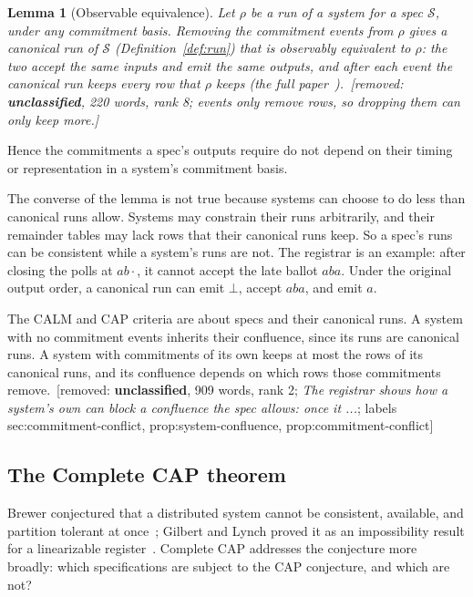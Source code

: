 \documentclass[sigconf]{cidr-2027}
\newtheorem{lemma}{Lemma}
\theoremstyle{remark}
\newcommand{\commitment}{commitment\xspace}
\newcommand{\commitments}{commitments\xspace}
\newcommand{\Spec}{\mathcal{S}}
\newcommand{\extended}{the full paper~\cite{hellerstein2026completecalmfull}}
\newcommand{\removednote}[1]{{\color{cutred}\footnotesize\,[removed: #1]\,}}
\begin{document}
\begin{lemma}[Observable equivalence]
\label{lem:canonical-equivalent}
Let $\rho$ be a run of a system for a spec $\Spec$, under any \commitment
basis. \textcolor{newblue}{Removing the \commitment events from $\rho$ gives a canonical run of
$\Spec$ (Definition~\ref{def:run}) that is \emph{observably equivalent} to
$\rho$: the two accept the same inputs and emit the same outputs, and after each
event the canonical run keeps every row that $\rho$ keeps (\extended).} \removednote{\textbf{unclassified}, 220 words, rank 8; \textit{events only remove rows, so dropping them can only keep more.}}
\end{lemma}

\textcolor{newblue}{Hence the \commitments a spec's outputs require do not depend on their timing or
representation in a system's \commitment basis.}

\textcolor{newblue}{The converse of the lemma is not true because systems can choose to do less
than canonical runs allow.} Systems may constrain their runs arbitrarily, and
their remainder tables may lack rows that their canonical runs keep. So a spec's runs
can be consistent while a system's runs are not. The registrar is an example: after closing the polls at $ab\cdot$, it cannot
accept the late ballot $aba$. Under the original output order, a canonical run
can emit $\bot$, accept $aba$, and emit $a$.

The CALM and CAP criteria are
about specs and their canonical runs. \textcolor{newblue}{A system with no \commitment events
inherits their confluence, since its runs are canonical runs.} A system
with \commitments of its own keeps at most the rows of its canonical runs, and
its confluence depends on which rows those \commitments remove. \removednote{\textbf{unclassified}, 909 words, rank 2; \textit{The registrar shows how a system's own can block a confluence the spec allows: once it ...}; labels sec:commitment-conflict, prop:system-confluence, prop:commitment-conflict}

\subsection{The Complete CAP theorem}
\label{sec:complete-cap}

Brewer conjectured that a distributed system cannot be consistent, available,
and partition tolerant at once~\cite{brewer2000towards}; Gilbert and Lynch
proved it as an impossibility result for a linearizable register~\cite{gilbert2002cap}. Complete CAP addresses the conjecture more broadly:
which specifications are subject to the CAP
conjecture, and which are not?
\end{document}
